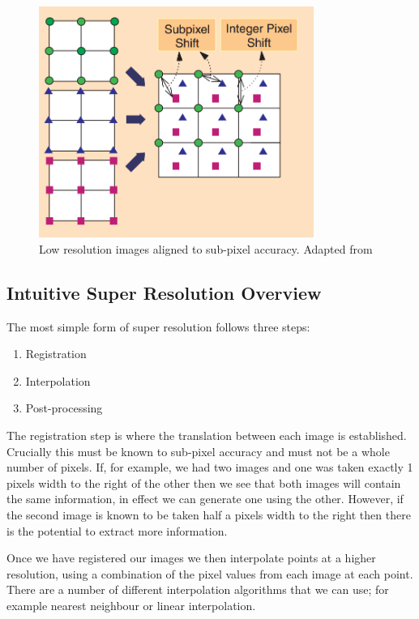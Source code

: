 \begin{figure}[h]
    \centering
	\includegraphics[width=0.8\textwidth]{images/background/super_resolution.png}
    \caption{Low resolution images aligned to sub-pixel accuracy. Adapted from \cite{superresolution2}}
    \label{fig:superresolution}
\end{figure}

\subsection*{Intuitive Super Resolution Overview}
The most simple form of super resolution follows three steps:

\begin{enumerate}
	\item Registration
	\item Interpolation
	\item Post-processing
\end{enumerate}

The registration step is where the translation between each image is established. Crucially this must be known to sub-pixel accuracy and must not be a whole number of pixels. If, for example, we had two images and one was taken exactly 1 pixels width to the right of the other then we see that both images will contain the same information, in effect we can generate one using the other. However, if the second image is known to be taken half a pixels width to the right then there is the potential to extract more information.

Once we have registered our images we then interpolate points at a higher resolution, using a combination of the pixel values from each image at each point. There are a number of different interpolation algorithms that we can use; for example nearest neighbour or linear interpolation.

